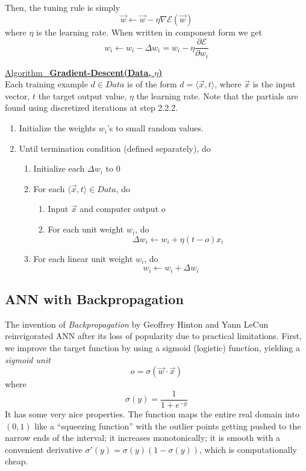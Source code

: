\documentclass[12pt]{article}  %
\newcommand{\algtitle}[1]{\underline{Algorithm \ {\bf #1}} \vspace*{1mm}\\}
\begin{document}
Then, the tuning rule is simply $$\vec{w} \leftarrow \vec{w} - \eta \nabla \mathcal{E}(\vec{w})$$ where $\eta$ is the learning rate. When written in component form we get $$w_i \leftarrow w_i - \Delta w_i = w_i - \eta \frac{\partial \mathcal{E}}{\partial w_i}$$


\algtitle{Gradient-Descent(Data, $\eta$)}
Each training example $d \in Data$ is of the form $d = \langle \vec{x}, t \rangle$, where $\vec{x}$ is the input vector, $t$ the target output value, $\eta$ the learning rate. Note that the partials are found using discretized iterations at step 2.2.2.

\begin{enumerate}
	\item Initialize the weights $w_i$'s to small random values.
	\item Until termination condition (defined separately), do
		\begin{enumerate}
			\item Initialize each $\Delta w_i$ to 0
			\item For each $\langle \vec{x}, t \rangle \in Data$, do 
			\begin{enumerate}
				\item Input $\vec{x}$ and computer output $o$
				\item For each unit weight $w_i$, do $$\Delta w_i \leftarrow w_i + \eta(t-o)x_i$$
			\end{enumerate}
			\item For each linear unit weight $w_i$, do $$w_i \leftarrow w_i + \Delta w_i$$
		\end{enumerate}
\end{enumerate}





\subsection{ANN with Backpropagation}

The invention of {\em Backpropagation} by Geoffrey Hinton and Yann LeCun reinvigorated ANN after its loss of popularity due to practical limitations. First, we improve the target function by using a sigmoid (logistic) function, yielding a {\em sigmoid unit} $$o = \sigma (\vec{w} \cdot \vec{x})$$ where $$\sigma(y) = \frac{1}{1+e^{-y}}$$ It has some very nice properties. The function maps the entire real domain into $(0,1)$ like a ``squeezing function'' with the outlier points getting pushed to the narrow ends of the interval; it increases monotonically; it is smooth with a convenient derivative $\sigma'(y) = \sigma(y) (1 - \sigma(y))$, which is computationally cheap.
\end{document}
